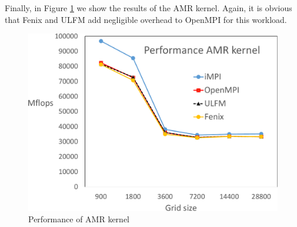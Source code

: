 Finally, in Figure \ref{fig:AMR} we show the results of the AMR kernel.
Again, it is obvious that Fenix and ULFM add negligible overhead to
OpenMPI for this workload.
\begin{figure}
  \centering
  \includegraphics[width=\columnwidth]{AMR_overheads-crop.pdf}
  \caption{Performance of AMR kernel}
  \label{fig:AMR}
\end{figure}
